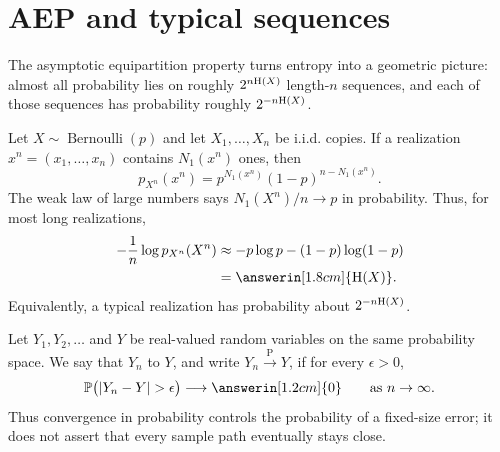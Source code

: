 \section{AEP and typical sequences}\label{sec:aep}
\quad{}

\begin{strand}
The asymptotic equipartition property turns entropy into a geometric picture:
almost all probability lies on roughly $2^{n\mathrm{H}(X)}$ length-$n$ sequences,
and each of those sequences has probability roughly $2^{-n\mathrm{H}(X)}$.
\end{strand}



\begin{example}
Let $X\sim\operatorname{Bernoulli}(p)$ and let $X_1,\ldots,X_n$ be i.i.d.
copies. If a realization $x^n=(x_1,\ldots,x_n)$ contains $N_1(x^n)$ ones,
then
\[
  p_{X^n}(x^n)=p^{N_1(x^n)}(1-p)^{n-N_1(x^n)}.
\]
The weak law of large numbers says $N_1(X^n)/n\to p$ in probability. Thus, for
most long realizations,
\[
\begin{aligned}
  -\frac1n\log p_{X^n}(X^n)
  &\approx -p\log p-(1-p)\log(1-p)\\
  &=\answerin[1.8cm]{\Ent(X)}.
\end{aligned}
\]
Equivalently, a typical realization has probability about $2^{-n\mathrm{H}(X)}$.
\end{example}


\begin{definition}\label{def:convergence-in-probability}
Let $Y_1,Y_2,\ldots$ and $Y$ be real-valued random variables on the same
probability space. We say that $Y_n$  to $Y$,
and write $Y_n\xrightarrow{\mathrm{P}}Y$, if for every $\epsilon>0$,
\[
  \PP\bigl(|Y_n-Y|>\epsilon\bigr)
  \longrightarrow \answerin[1.2cm]{0}
  \qquad\text{as }n\to\infty.
\]
Thus convergence in probability controls the probability of a fixed-size error;
it does not assert that every sample path eventually stays close.
\end{definition}

